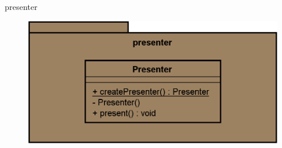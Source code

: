 \begin{frame}{presenter}
  \begin{figure}
    \centering
    \includegraphics[width=\textwidth]{./images/presenter.png}
  \end{figure}
\end{frame}
